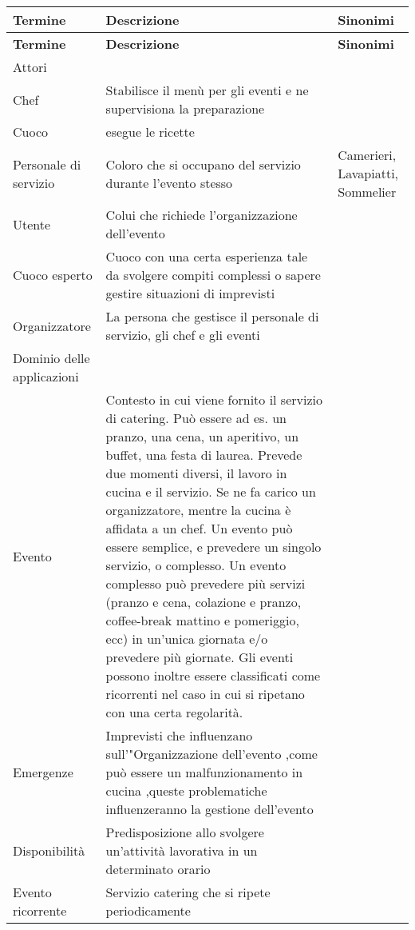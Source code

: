 
\begin{longtable}{|p{4cm}|p{4cm}|p{4cm}|}
  \hline
  \textbf{Termine} & \textbf{Descrizione} & \textbf{Sinonimi} \\
  \hline
  \endfirsthead
  \hline
  \textbf{Termine} & \textbf{Descrizione} & \textbf{Sinonimi} \\
  \hline
  \endhead
  \hline
  \endfoot
  
  \hline
  Attori & & \\
  \hline
  Chef & Stabilisce il menù per gli eventi e ne supervisiona la preparazione & \\
  \hline
  Cuoco & esegue le ricette & \\
  \hline
  Personale di servizio & Coloro che si occupano del servizio durante l'evento stesso & Camerieri, Lavapiatti, Sommelier \\
  \hline
  Utente & Colui che richiede l'organizzazione dell'evento & \\
  \hline
  Cuoco esperto & Cuoco con una certa esperienza tale da svolgere compiti complessi o sapere gestire situazioni di imprevisti & \\
  \hline
  Organizzatore & La persona che gestisce il personale di servizio, gli chef e gli eventi & \\
  \hline
  Dominio delle applicazioni & & \\
  \hline
  Evento & Contesto in cui viene fornito il servizio di catering. Può essere ad es. un pranzo, una cena, un aperitivo, un buffet, una festa di laurea. Prevede due momenti diversi, il lavoro in cucina e il servizio. Se ne fa carico un organizzatore, mentre la cucina è affidata a un chef. Un evento può essere semplice, e prevedere un singolo servizio, o complesso. Un evento complesso può prevedere più servizi (pranzo e cena, colazione e pranzo, coffee-break mattino e pomeriggio, ecc) in un'unica giornata e/o prevedere più giornate. Gli eventi possono inoltre essere classificati come ricorrenti nel caso in cui si ripetano con una certa regolarità. & \\
  \hline
  Emergenze & Imprevisti che influenzano sull'"Organizzazione dell'evento ,come può essere un malfunzionamento in cucina ,queste problematiche influenzeranno la gestione dell'evento & \\
  \hline
  Disponibilità & Predisposizione allo svolgere un'attività lavorativa in un determinato orario & \\
  \hline
  Evento ricorrente & Servizio catering che si ripete periodicamente & \\

\end{longtable}
